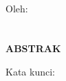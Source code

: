 \clearpage
{}
{}
\begin{center}
    \textbf{\large{\judul}}\\[0.5cm]
    Oleh:\\
    \penulisPertama\\
    \nimPertama\\[2em]
    \textbf{ABSTRAK}\\[0.5cm]
\end{center}

\noindent {\lipsum[2]}

\noindent Kata kunci: \katakunci
